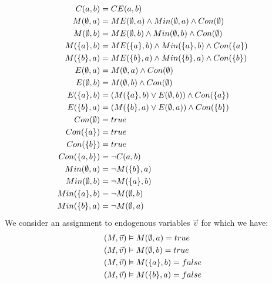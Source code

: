 \documentclass{article}
\begin{document}
\begin{example}
\begin{align*}
        C(a,b)           & = CE(a,b)                                             \\
        M(\emptyset, a)         & =  ME(\emptyset,a) \wedge Min(\emptyset, a) \wedge Con(\emptyset)          \\
        M(\emptyset, b)         & =  ME(\emptyset,b) \wedge Min(\emptyset, b) \wedge Con(\emptyset)          \\
        M(\{a\}, b)      & =  ME(\{a\},b) \wedge Min(\{a\}, b) \wedge Con(\{a\}) \\
        M(\{b\}, a)      & =  ME(\{b\},a) \wedge Min(\{b\}, a) \wedge Con(\{b\}) \\
        E(\emptyset, a)         & =  M(\emptyset,a) \wedge Con(\emptyset)                             \\
        E(\emptyset, b)         & = M(\emptyset,b) \wedge Con(\emptyset)                              \\
        E(\{a\}, b)      & = (M(\{a\},b) \vee E(\emptyset,b))\wedge Con(\{a\})          \\
        E(\{b\}, a)      & = (M(\{b\},a) \vee E(\emptyset,a))\wedge Con(\{b\})          \\
        Con(\emptyset)          & = true                                                \\
        Con(\{a\})       & = true                                                \\
        Con(\{b\})       & = true                                                \\
        Con(\{a,b\})     & = \neg C(a,b)                                         \\
        Min(\emptyset, a)       & = \neg M(\{b\},a)                                     \\
        Min(\emptyset, b)       & = \neg M(\{a\},b)                                     \\
        Min(\{a\}, b)    & = \neg M(\emptyset, b)                                       \\
        Min(\{b\}, a)    & = \neg M(\emptyset, a)                                       \\
    \end{align*}
    We consider an assignment to endogenous variables $\vec v$ for which we have:
    \begin{align*}
        (M,\vec v) & \vDash M(\e,a) = true       \\
        (M,\vec v) & \vDash M(\e,b) = true       \\
        (M,\vec v) & \vDash M(\s{a},b) = false   \\
        (M,\vec v) & \vDash M(\s{b},a) = false   \\

\end{align*}
\end{example}
\end{document}
